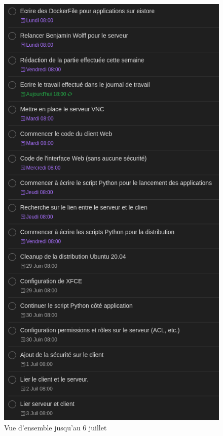 \begin{figure}[H]
	\centering
	\includegraphics[scale=0.25]{images/planning/overview6Jul.png}
	\caption{Vue d'ensemble jusqu'au 6 juillet}
	\label{fig:ov6jul}
\end{figure}


